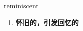 
\begin{frame}
{\huge reminiscent}
\begin{center}
\begin{enumerate}\Large
  \item \textbf{怀旧的，引发回忆的}
\end{enumerate}
\end{center}
\end{frame}
